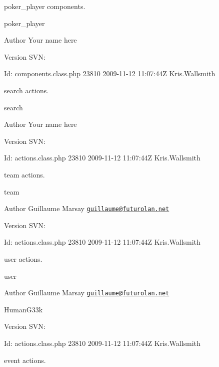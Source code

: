 poker\-\_\-player components.

poker\-\_\-player \begin{DoxyAuthor}{Author}
Your name here 
\end{DoxyAuthor}
\begin{DoxyVersion}{Version}
S\-V\-N\-: 
\end{DoxyVersion}
\begin{DoxyParagraph}{Id\-:}
components.\-class.\-php 23810 2009-\/11-\/12 11\-:07\-:44\-Z Kris.\-Wallsmith 
\end{DoxyParagraph}


search actions.

search \begin{DoxyAuthor}{Author}
Your name here 
\end{DoxyAuthor}
\begin{DoxyVersion}{Version}
S\-V\-N\-: 
\end{DoxyVersion}
\begin{DoxyParagraph}{Id\-:}
actions.\-class.\-php 23810 2009-\/11-\/12 11\-:07\-:44\-Z Kris.\-Wallsmith 
\end{DoxyParagraph}


team actions.

team \begin{DoxyAuthor}{Author}
Guillaume Marsay \href{mailto:guillaume@futurolan.net}{\tt guillaume@futurolan.\-net} 
\end{DoxyAuthor}
\begin{DoxyVersion}{Version}
S\-V\-N\-: 
\end{DoxyVersion}
\begin{DoxyParagraph}{Id\-:}
actions.\-class.\-php 23810 2009-\/11-\/12 11\-:07\-:44\-Z Kris.\-Wallsmith 
\end{DoxyParagraph}


user actions.

user \begin{DoxyAuthor}{Author}
Guillaume Marsay \href{mailto:guillaume@futurolan.net}{\tt guillaume@futurolan.\-net} 

Human\-G33k 
\end{DoxyAuthor}
\begin{DoxyVersion}{Version}
S\-V\-N\-: 
\end{DoxyVersion}
\begin{DoxyParagraph}{Id\-:}
actions.\-class.\-php 23810 2009-\/11-\/12 11\-:07\-:44\-Z Kris.\-Wallsmith 
\end{DoxyParagraph}


event actions.

